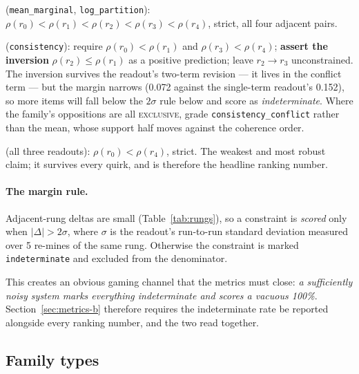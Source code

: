 \documentclass[11pt]{article}
\newcommand{\cExc}{\textsc{exclusive}}
\newcommand{\readout}[1]{\texttt{#1}}
\begin{document}
\begin{description}[leftmargin=*,nosep]
  \item[C1 --- full chain] (\readout{mean\_marginal}, \readout{log\_partition}):
        $\rho(r_0) < \rho(r_1) < \rho(r_2) < \rho(r_3) < \rho(r_4)$, strict, all four adjacent
        pairs.
  \item[C2 --- quirk chain] (\readout{consistency}): require
        $\rho(r_0)<\rho(r_1)$ and $\rho(r_3)<\rho(r_4)$; \textbf{assert the inversion}
        $\rho(r_2) \leq \rho(r_1)$ as a positive prediction; leave $r_2 \to r_3$
        unconstrained. The inversion survives the readout's two-term revision --- it lives in
        the conflict term --- but the margin narrows (0.072 against the single-term readout's
        0.152), so more items will fall below the $2\sigma$ rule below and score as
        \emph{indeterminate}. Where the family's oppositions are all \cExc, grade
        \texttt{consistency\_conflict} rather than the mean, whose support half moves against
        the coherence order.
  \item[C3 --- endpoints] (all three readouts): $\rho(r_0) < \rho(r_4)$, strict. The weakest and
        most robust claim; it survives every quirk, and is therefore the headline ranking
        number.
\end{description}

\paragraph{The margin rule.} Adjacent-rung deltas are small (Table~\ref{tab:rungs}), so a
constraint is \emph{scored} only when $|\Delta| > 2\sigma$, where $\sigma$ is the readout's
run-to-run standard deviation measured over 5 re-mines of the same rung. Otherwise the
constraint is marked \texttt{indeterminate} and excluded from the denominator.

This creates an obvious gaming channel that the metrics must close: \emph{a sufficiently noisy
system marks everything indeterminate and scores a vacuous 100\%}. Section~\ref{sec:metrics-b}
therefore requires the indeterminate rate be reported alongside every ranking number, and the
two read together.

\subsection{Family types}
\label{sec:familytypes}
\end{document}
